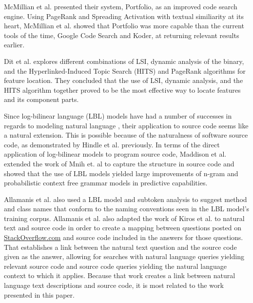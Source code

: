 McMillian et al. \cite{mcmillan2011portfolio} presented their system,
Portfolio, as an improved code search engine. Using PageRank and Spreading
Activation with textual similiarity at its heart, McMillian et al. showed
that Portfolio was more capable than the current tools of the time, Google Code
Search and Koder, at returning relevant results earlier.

Dit et al. \cite{dit2013integrating} explores different combinations of LSI, 
dynamic analysis of the binary, and the Hyperlinked-Induced Topic Search (HITS)
and PageRank algorithms for feature location. They concluded that the use
of LSI, dynamic analysis, and the HITS algorithm together proved to be the
most effective way to locate features and its component parts.

\label{subsec:rel_lbl}

Since log-bilinear language (LBL) models have had a number of successes in 
regards to modeling natural language \cite{kiros2014multimodal}
\cite{mikolov2013efficient} \cite{mnih2007three} \cite{mnih2013learning}, their
application to source code seems like a natural extension. This is possible
because of the naturalness of software source code, as demonstrated by
Hindle et al. \cite{hindle2012naturalness} previously. In terms of the direct
application of log-bilinear models to program source code, Maddison et al.
\cite{maddison2014structured} extended the work of Mnih et. al
\cite{mnih2012fast} to capture the structure in source code and showed that the
use of LBL models yielded large improvements of n-gram and probabilistic
context free grammar models in predictive capabilities.

Allamanis et al. \cite{allamanis2015suggesting} also used a LBL model and
subtoken analysis to suggest method and class names that conform to the
naming conventions seen in the LBL model's training corpus. Allamanis et al.
\cite{allamanis2015bimodal} also adapted the work of Kiros et al. 
\cite{kiros2014multimodal} to natural text and source code in order to create
a mapping between questions posted on
\href{http://www.stackoverflow.com}{StackOverflow.com} and source code included
in the answers for those questions. That establishes a link between the natural
text question and the source code given as the answer, allowing for searches
with natural language queries yielding relevant source code and source code
queries yielding the natural language context to which it applies. Because that
work creates a link between natural language text descriptions and source code,
it is most related to the work presented in this paper.